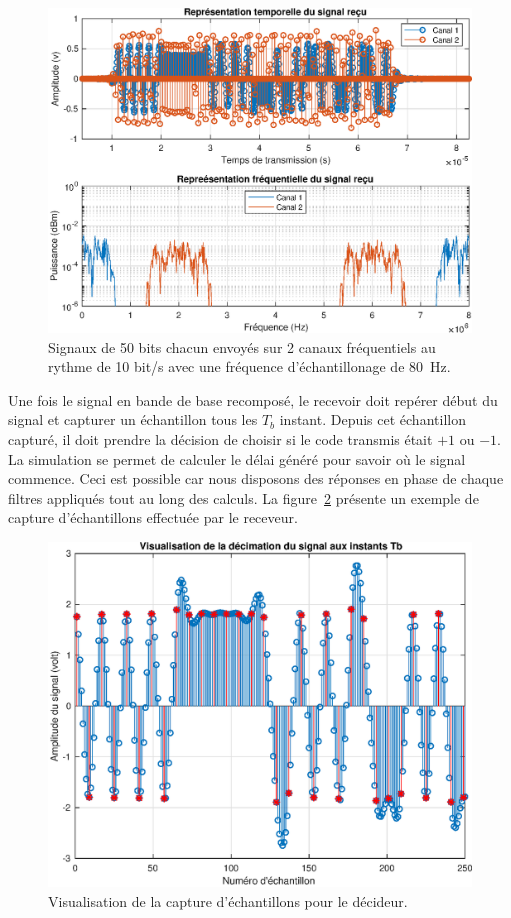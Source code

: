 \documentclass[10pt, oneside, a4paper]{article}
\begin{document}
\begin{figure}[p]
    \centering
    \includegraphics[height=0.4\textheight]{eps/receiver.eps}
    \caption{Signaux de 50 bits chacun envoyés sur 2 canaux fréquentiels au rythme de 10 bit/s
             avec une fréquence d'échantillonage de \SI{80}{\hertz}.}
    \label{fig:receiver}
\end{figure}

Une fois le signal en bande de base recomposé, le recevoir doit repérer début du signal et capturer un échantillon tous les $T_b$ instant.
Depuis cet échantillon capturé, il doit prendre la décision de choisir si le code transmis était $+1$ ou $-1$.
La simulation se permet de calculer le délai généré pour savoir où le signal commence.
Ceci est possible car nous disposons des réponses en phase de chaque filtres appliqués tout au long des calculs.
La figure~\ref{fig:decimate} présente un exemple de capture d'échantillons effectuée par le receveur.

\begin{figure}[p]
    \centering
    \includegraphics[height=0.4\textheight]{eps/decimate.eps}
    \caption{Visualisation de la capture d'échantillons pour le décideur.}
    \label{fig:decimate}
\end{figure}
\end{document}
